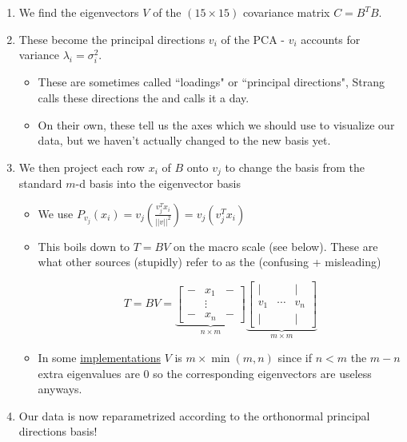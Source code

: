\documentclass[12pt]{article} %
\begin{document}
\begin{enumerate}[itemsep = -1pt,topsep=-1pt]
    \item
    We find the eigenvectors $V$ of the $(15 \times 15)$ covariance matrix $C = B^TB$. 
    \item 
    These become the principal directions $v_i$ of the PCA - $v_i$ accounts for variance $\lambda_i = \sigma_i^2$.
    \begin{itemize}[topsep=-1pt,itemsep=-1pt]
        \item These are sometimes called ``loadings" or ``principal directions", Strang calls these directions the  and calls it a day.
        \item On their own, these tell us the axes which we should use to visualize our data, but we haven't actually changed to the new basis yet.
    \end{itemize}
    
    \item We then project each row $x_i$ of $B$ onto $v_j$ to change the basis from the standard $m$-d basis into the eigenvector basis
    \begin{itemize}[topsep=-3pt,itemsep=-1pt]
        \item We use $P_{v_j}(x_i) = v_j \left( \frac{v_j^Tx_i}{||v||^2}\right) = v_j (v_j^T x_i)$
        \item This boils down to $T = BV$ on the macro scale (see below). These are what other sources (stupidly) refer to as the  (confusing + misleading)
    
    \begin{equation*}
        T = BV = 
        \underbrace{
        \begin{bmatrix}
        - & x_1 & - \\
        & \vdots & \\
        - & x_n & -
        \end{bmatrix}}
        _{n \times m}
        \underbrace{
        \begin{bmatrix}
        | & & | \\
        v_1 & \cdots & v_n \\
        | & & |
        \end{bmatrix}}
        _{m \times m}
    \end{equation*}
    \item In some \href{https://stackoverflow.com/questions/51040075/why-sklearn-pca-needs-more-samples-than-new-featuresn-components}{implementations} $V$ is $m \times \min(m,n)$ since if $n < m$ the $m-n$ extra eigenvalues are 0 so the corresponding eigenvectors are useless anyways.
    \end{itemize}
    \item Our data is now reparametrized according to the orthonormal principal directions basis!
\end{enumerate}
\end{document}
